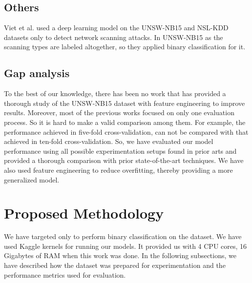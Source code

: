 \documentclass[14pt, conference]{IEEEtran}
\begin{document}
\subsection{Others}
Viet et al. \cite{viet2018using} used a deep learning model on the UNSW-NB15 and NSL-KDD datasets only to detect network scanning attacks. In UNSW-NB15 as the scanning types are
labeled altogether, so they applied binary classification for it.


\subsection{Gap analysis}
To the best of our knowledge, there has been no work that has provided a thorough study of the UNSW-NB15 dataset with feature engineering to improve results. Moreover, most of the previous works focused on only one evaluation process. So it is hard to make a valid comparison among them. For example, the performance achieved in five-fold cross-validation, can not be compared with that achieved in ten-fold cross-validation. So, we have evaluated our model performance using all possible experimentation setups found in prior arts and provided a thorough comparison with prior state-of-the-art techniques. We have also used feature engineering to reduce overfitting, thereby providing a more generalized model.



\section{Proposed Methodology} \label{methodology}
We have targeted only to perform binary classification on the dataset. We have used Kaggle kernels for running our models. It provided us with 4 CPU cores, 16 Gigabytes of RAM when this work was done. In the following subsections,  we have described how the dataset was prepared for experimentation and the performance metrics used for evaluation. 
\end{document}
